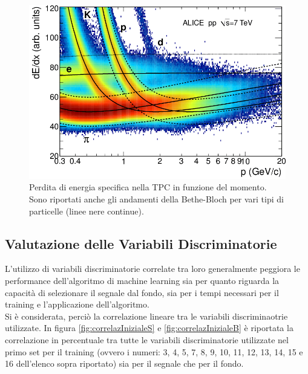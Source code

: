    
   \begin{figure}[htbp]
        \centering
        \includegraphics[width=0.7\linewidth]{training&testing/Specific-energy-loss-in-the-TPC.png}
        \caption{ Perdita di energia specifica nella TPC in funzione del momento. Sono riportati anche gli andamenti della Bethe-Bloch per vari tipi di particelle (linee nere continue).}
        \label{fig:BBnellaTPC}
    \end{figure}
   
  
  \subsection{Valutazione delle Variabili Discriminatorie}
  
    L'utilizzo di variabili discriminatorie correlate tra loro generalmente peggiora le performance dell'algoritmo di machine learning sia per quanto riguarda la capacit\`a di selezionare il segnale dal fondo, sia per i tempi necessari per il training e l'applicazione dell'algoritmo.  
    \\Si \`e considerata, perci\`o la correlazione lineare tra le variabili discriminaotrie utilizzate. In figura \ref{fig:correlazInizialeS} e \ref{fig:correlazInizialeB} \`e riportata la correlazione in percentuale tra tutte le variabili discriminatorie utilizzate nel primo set per il training (ovvero i numeri: 3, 4, 5, 7, 8, 9, 10, 11, 12, 13, 14, 15 e 16 dell'elenco sopra riportato) sia per il segnale che per il fondo.
    
